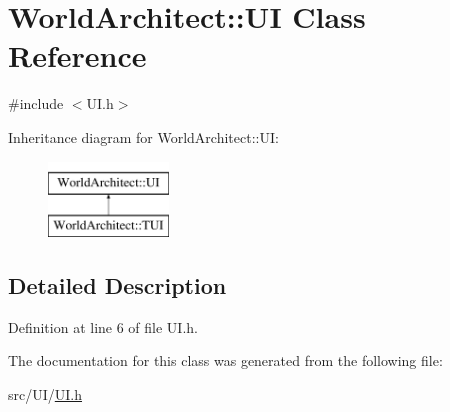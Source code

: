 \hypertarget{class_world_architect_1_1_u_i}{}\section{World\+Architect\+::UI Class Reference}
\label{class_world_architect_1_1_u_i}


{\ttfamily \#include $<$U\+I.\+h$>$}

Inheritance diagram for World\+Architect\+::UI\+:\begin{figure}[H]
\begin{center}
\leavevmode
\includegraphics[height=2.000000cm]{class_world_architect_1_1_u_i}
\end{center}
\end{figure}


\subsection{Detailed Description}


Definition at line 6 of file U\+I.\+h.



The documentation for this class was generated from the following file\+:\begin{DoxyCompactItemize}
\item 
src/\+U\+I/\mbox{\hyperlink{_u_i_8h}{U\+I.\+h}}\end{DoxyCompactItemize}
